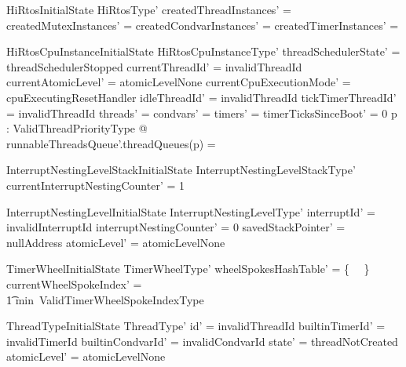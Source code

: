 \documentclass[11pt,letterpaper,twoside,openany]{book}
\begin{document}
\begin{schema}{HiRtosInitialState}
    HiRtosType'
\where
    createdThreadInstances' =  \emptyset
\also
    createdMutexInstances' = \emptyset
\also
    createdCondvarInstances' = \emptyset
\also
    createdTimerInstances' = \emptyset
\end{schema}

\begin{schema}{HiRtosCpuInstanceInitialState}
    HiRtosCpuInstanceType'
\where
    threadSchedulerState' = threadSchedulerStopped
\also
    currentThreadId' = invalidThreadId
\also
    currentAtomicLevel' = atomicLevelNone
\also
    currentCpuExecutionMode' = cpuExecutingResetHandler
\also
    idleThreadId' = invalidThreadId
\also
    tickTimerThreadId' = invalidThreadId
\also
    threads' = \emptyset
\also
    condvars' = \emptyset
\also
    timers' = \emptyset
\also
    timerTicksSinceBoot' = 0
\also
    \forall p : ValidThreadPriorityType @ \\
	runnableThreadsQueue'.threadQueues(p) = \emptyset
\end{schema}

\begin{schema}{InterruptNestingLevelStackInitialState}
   InterruptNestingLevelStackType'
\where
   currentInterruptNestingCounter' = 1 \\
\end{schema}

\begin{schema}{InterruptNestingLevelInitialState}
   InterruptNestingLevelType'
\where
   interruptId' = invalidInterruptId
\also
   interruptNestingCounter' = 0
\also
   savedStackPointer' = nullAddress
\also
   atomicLevel' = atomicLevelNone
\end{schema}

\begin{schema}{TimerWheelInitialState}
   TimerWheelType'
\where
   \ran wheelSpokesHashTable' = \{~ \emptyset ~\}
\also
   currentWheelSpokeIndex' = \\
   \t1 min~ValidTimerWheelSpokeIndexType
\end{schema}


\begin{schema}{ThreadTypeInitialState}
   ThreadType'
\where
   id' = invalidThreadId
\also
   builtinTimerId' = invalidTimerId
\also
   builtinCondvarId' = invalidCondvarId
\also
   state' = threadNotCreated
\also
   atomicLevel' = atomicLevelNone
\end{schema}
\end{document}
